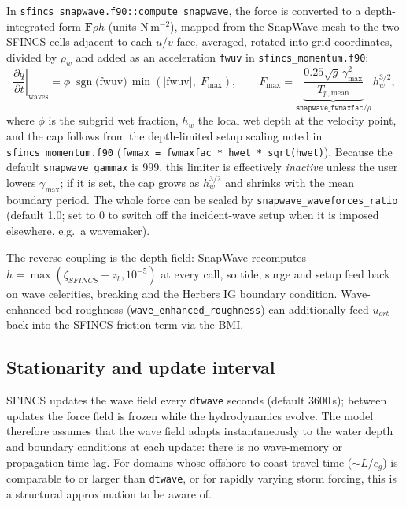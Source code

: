 \documentclass[11pt,a4paper]{article}
\newcommand{\code}[1]{\texttt{#1}}
\begin{document}
In \code{sfincs\_snapwave.f90::compute\_snapwave}, the force is converted to a
depth-integrated form $\mathbf{F}\rho h$ (units N\,m$^{-2}$), mapped from the
SnapWave mesh to the two SFINCS cells adjacent to each $u/v$ face, averaged,
rotated into grid coordinates, divided by $\rho_w$ and added as an acceleration
\code{fwuv} in \code{sfincs\_momentum.f90}:
\begin{equation}
\left.\frac{\partial q}{\partial t}\right|_{\mathrm{waves}}
=\phi\;\operatorname{sgn}\!\bigl(\mathrm{fwuv}\bigr)\,
\min\!\left(|\mathrm{fwuv}|,\;F_{\max}\right),
\qquad
F_{\max}=\underbrace{\frac{0.25\sqrt{g}\,\gamma_{\max}^{2}}{T_{p,\mathrm{mean}}}}_{\code{snapwave\_fwmaxfac}/\rho}\,h_{w}^{3/2},
\label{eq:limiter}
\end{equation}
where $\phi$ is the subgrid wet fraction, $h_w$ the local wet depth at the
velocity point, and the cap follows from the depth-limited setup scaling noted
in \code{sfincs\_momentum.f90}
(\code{fwmax = fwmaxfac * hwet * sqrt(hwet)}). Because the default
\code{snapwave\_gammax} is 999, this limiter is effectively \emph{inactive}
unless the user lowers $\gamma_{\max}$; if it is set, the cap grows as
$h_w^{3/2}$ and shrinks with the mean boundary period. The whole force can be scaled by
\code{snapwave\_waveforces\_ratio} (default 1.0; set to 0 to switch off the
incident-wave setup when it is imposed elsewhere, e.g.\ a wavemaker).

The reverse coupling is the depth field: SnapWave recomputes
$h=\max(\zeta_{SFINCS}-z_b,10^{-5})$ at every call, so tide, surge and setup
feed back on wave celerities, breaking and the Herbers IG boundary condition.
Wave-enhanced bed roughness (\code{wave\_enhanced\_roughness}) can additionally
feed $u_{orb}$ back into the SFINCS friction term via the BMI.

\subsection{Stationarity and update interval}

SFINCS updates the wave field every \code{dtwave} seconds (default 3600\,s);
between updates the force field is frozen while the hydrodynamics evolve. The
model therefore assumes that the wave field adapts instantaneously to the water
depth and boundary conditions at each update: there is no wave-memory or
propagation time lag. For domains whose offshore-to-coast travel time
($\sim L/c_g$) is comparable to or larger than \code{dtwave}, or for rapidly
varying storm forcing, this is a structural approximation to be aware of.
\end{document}
